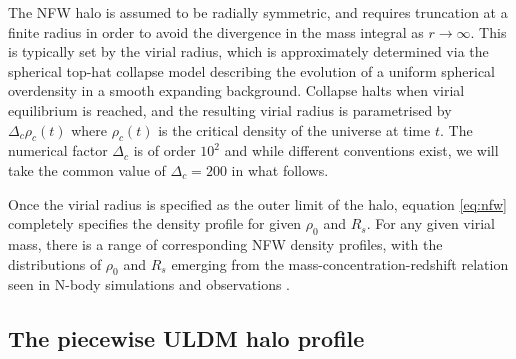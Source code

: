 \documentclass[a4paper,11pt]{article}
\begin{document}
The NFW halo is assumed to be radially symmetric, and requires truncation at a finite radius in order to avoid the divergence in the mass integral as $r\rightarrow \infty$. This is typically set by the virial radius, which is approximately determined via the spherical top-hat collapse model \cite{White:2000jv, Suto:2015jdt, Herrera:2017epn} describing the evolution of a uniform spherical overdensity in a smooth expanding background. Collapse halts when virial equilibrium is reached, and the resulting virial radius is parametrised by $\Delta_c \rho_c(t)$ where $\rho_c(t)$ is the critical density of the universe at time $t$. The numerical factor $\Delta_c$ is of order $10^2$ and while different conventions exist, we will take the common value of $\Delta_c = 200$ \cite{Richings:2018} in what follows. 

Once the virial radius is specified as the outer limit of the halo, equation \ref{eq:nfw} completely specifies the density profile for given  $\rho_0$ and $R_s$. For any given virial mass, there is a range of corresponding NFW density profiles, with the distributions of $\rho_0$ and $R_s$ emerging from the mass-concentration-redshift relation seen in N-body simulations and observations \cite{Ludlow:2013vxa, Ragagnin:2018enf}. 

\subsection{The piecewise ULDM halo profile}
\end{document}
